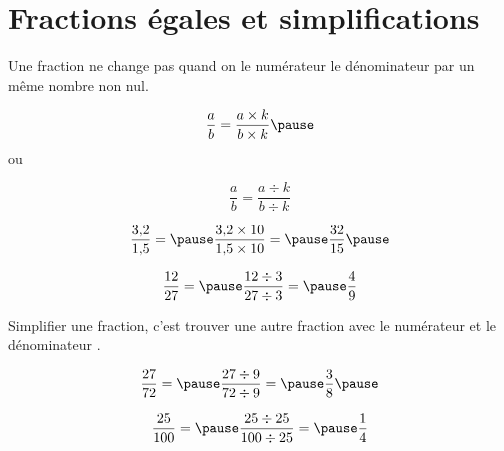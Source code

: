 \documentclass[xcolor={dvipsnames}]{beamer}
\begin{document}
\section{Fractions égales et simplifications}


\begin{frame}
	\begin{myprop}
		Une fraction ne change pas quand on  le numérateur  le dénominateur par un même nombre non nul.\pause
		
				
			\begin{equation*}
				\dfrac{a}{b} = \dfrac{a \times k}{b \times k} \pause
			\end{equation*}
			ou 
			
			\begin{equation*}
				\dfrac{a}{b} = \dfrac{a \div k}{b \div k} 
			\end{equation*}
		
	\end{myprop}


	\begin{myexs}
		
			
			\begin{equation*}
			\dfrac{\num{3.2}}{\num{1.5}} = \pause \dfrac{\num{3.2} \times 10 }{\num{1.5} \times 10 } = \pause \dfrac{\num{32}}{\num{15}} \pause
			\end{equation*}
			
			
			\begin{equation*}
			\dfrac{\num{12}}{\num{27}} = \pause \dfrac{\num{12} \div 3 }{\num{27} \div 3 } = \pause \dfrac{\num{4}}{\num{9}} 
			\end{equation*}
	\end{myexs}
\end{frame}

\begin{frame}
	\begin{mydef}
		Simplifier une fraction, c'est trouver une autre fraction  avec le numérateur et le dénominateur .\pause
	\end{mydef}
	
	\begin{myex}

			\begin{equation*}
			\dfrac{\num{27}}{\num{72}} = \pause \dfrac{\num{27} \div 9 }{\num{72} \div 9 } = \pause \dfrac{\num{3}}{\num{8}} \pause
			\end{equation*}	
			
			\begin{equation*}
			\dfrac{\num{25}}{\num{100}} = \pause \dfrac{\num{25} \div 25 }{\num{100} \div 25 } = \pause \dfrac{\num{1}}{\num{4}} 
			\end{equation*}	

	\end{myex}
\end{frame}
\end{document}
